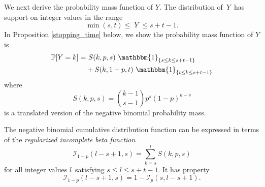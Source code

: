 \documentclass[sii]{ipart}
\begin{document}
We next derive the probability mass function of $Y$. The distribution of $\,Y\,$ has support on integer values in the range
\begin{equation*}               
     \min(s,t) \leq \; Y \;\leq s+t-1  \label{range.y.eq}.
\end{equation*}
In Proposition \ref{stopping_time} below, we show the probability mass function of $Y$ is
\begin{align} \label{eqn:pmf}
\mathbb{P} [Y=k] =& \ S(k, p, s) \ \mathbbm{1}_{\{s \leq k \leq s+t-1\}} \nonumber \\
  & + S(k, 1-p, t) \ \mathbbm{1}_{\{ t \leq k \leq s+t-1 \}}
\end{align}
where
\begin{equation} \label{eqn:N}
S(k, p, s) = {k-1 \choose s-1} p^s (1-p)^{k-s} 
\end{equation}
is a translated version of the negative binomial probability mass.

The negative binomial cumulative distribution function can be expressed in terms of the
{\em regularized incomplete beta function} \citep{Olver2010} 
\begin{equation*}
\mathcal{I}_{1-p}(l - s + 1, s) = \sum_{k=s}^l S(k, p, s) 
\end{equation*}
for all integer values $l\,$ satisfying $s \leq l \leq s+t-1$. It has property \citep{Uppuluri1967}
\begin{equation} \label{ribf}
\mathcal{I}_{1-p}(l-s+1, s) = 1 - \mathcal{I}_p(s, l-s+1).
\end{equation}
\end{document}
